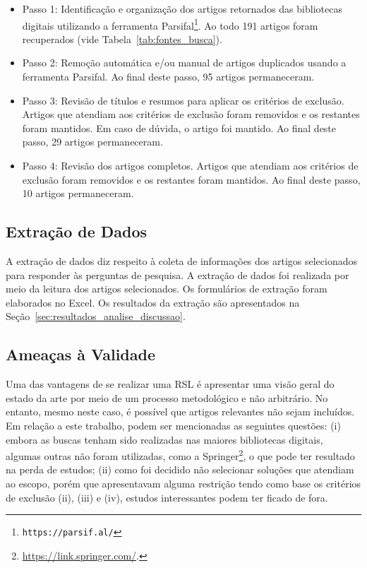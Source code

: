 \begin{itemize}
    \item Passo 1: Identificação e organização dos artigos retornados das bibliotecas digitais utilizando a ferramenta Parsifal\footnote{\texttt{https://parsif.al/}}. Ao todo 191 artigos foram recuperados (vide Tabela~\ref{tab:fontes_busca}).
    
    \item Passo 2: Remoção automática e/ou manual de artigos duplicados usando a ferramenta Parsifal. Ao final deste passo, 95 artigos permaneceram.

    \item Passo 3: Revisão de títulos e resumos para aplicar os critérios de exclusão. Artigos que atendiam aos critérios de exclusão foram removidos e os restantes foram mantidos. Em caso de dúvida, o artigo foi mantido. Ao final deste passo, 29 artigos permaneceram.
    
    \item Passo 4: Revisão dos artigos completos. Artigos que atendiam aos critérios de exclusão foram removidos e os restantes foram mantidos. Ao final deste passo, 10 artigos permaneceram.
\end{itemize}

\subsection{Extração de Dados}\label{sec:extracao}
 A extração de dados diz respeito à coleta de informações dos artigos selecionados para responder às perguntas de pesquisa. A extração de dados foi realizada por meio da leitura dos artigos selecionados. Os formulários de extração foram elaborados no Excel. Os resultados da extração são apresentados na Seção~\ref{sec:resultados_analise_discussao}.

\subsection{Ameaças à Validade}\label{sec:ameacas}
Uma das vantagens de se realizar uma RSL é apresentar uma visão geral do estado da arte por meio de um processo metodológico e não arbitrário. No entanto, mesmo neste caso, é possível que artigos relevantes não sejam incluídos. Em relação a este trabalho, podem ser mencionadas as seguintes questões: (i) embora as buscas tenham sido realizadas nas maiores bibliotecas digitais, algumas outras não foram utilizadas, como a Springer\footnote{\url{https://link.springer.com/}.}, o que pode ter resultado na perda de estudos; (ii) como foi decidido não selecionar soluções que atendiam ao escopo, porém que apresentavam alguma restrição tendo como base os critérios de exclusão (ii), (iii) e (iv), estudos interessantes podem ter ficado de fora.


